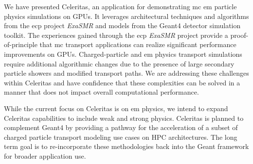 \documentclass[10pt]{article}
\begin{document}
We have presented Celeritas, an application for demonstrating \ac{mc} \ac{em}
particle physics simulations on GPUs. It leverages architectural techniques and
algorithms from the \ac{ecp} project \emph{ExaSMR} and models from the Geant4
detector simulation toolkit. The experiences gained through the \ac{ecp}
\emph{ExaSMR} project provide a proof-of-principle that \ac{mc} transport
applications can realize significant performance improvements on GPUs.
Charged-particle and \ac{em} physics transport simulations require additional
algorithmic changes due to the presence of large secondary particle showers and
modified transport paths. We are addressing these challenges within Celeritas
and have confidence that these complexities can be solved in a manner that does
not impact overall computational performance.

While the current focus on Celeritas is on \ac{em} physics, we intend to expand
Celeritas capabilities to include weak and strong physics. Celeritas is planned
to complement Geant4 by providing a pathway for the acceleration of a subset of
charged particle transport modeling use cases on HPC architectures. The long
term goal is to re-incorporate these methodologies back into the Geant framework
for broader application use.


\pagebreak
\printbibliography

\end{document}
